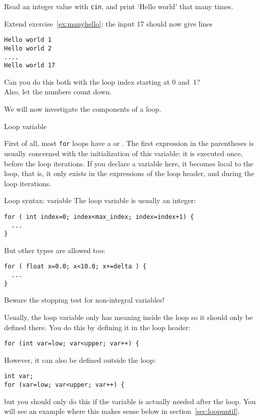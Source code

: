 \begin{exercise}
  \label{ex:manyhello}
  Read an integer value with \lstinline{cin}, and print `Hello world' that many times.
\end{exercise}
\begin{exercise}
  \label{ex:counthello}
  Extend exercise~\ref{ex:manyhello}: the input 17 should now give lines
\begin{verbatim}
Hello world 1
Hello world 2
....
Hello world 17
\end{verbatim}
Can you do this both with the loop index starting at 0 and~1?\\
Also, let the numbers count down.
\end{exercise}

We will now investigate the components of a loop.

 {Loop variable}

First of all, most \lstinline{for} loops have a
 or .
The first expression in the parentheses
is usually concerned with the initialization of this variable:
it is executed once, before the loop iterations.
If you declare a variable here, it becomes local to the loop,
that is, it only exists in the expressions of the loop header,
and during the loop iterations.

\begin{block}{Loop syntax: variable}
  \label{sl:for-syntax1}
  The loop variable is usually an integer:
\begin{lstlisting}
for ( int index=0; index<max_index; index=index+1) {
  ...
}
\end{lstlisting}
  But other types are allowed too:
\begin{lstlisting}
for ( float x=0.0; x<10.0; x+=delta ) {
  ...
}
\end{lstlisting}
Beware the stopping test for non-integral variables!
\end{block}

Usually, the loop variable only has
meaning inside the loop so it should only be defined there.
You do this by defining it  in the loop header:
\begin{lstlisting}
for (int var=low; var<upper; var++) {
\end{lstlisting}

However, it can also be defined outside the loop:
\begin{lstlisting}
int var;
for (var=low; var<upper; var++) {
\end{lstlisting}
but you should only do this if the variable
is actually needed after the loop.
You will see an example where this makes sense
below in section~\ref{sec:loopuntil}.
 
